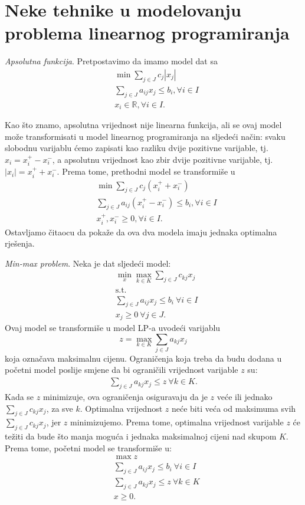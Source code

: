 \documentclass[a4paper, utf8, 11pt, colorlinks]{book}
\begin{document}
\section{Neke tehnike u modelovanju problema linearnog programiranja}

\emph{Apsolutna funkcija}.   Pretpostavimo da imamo model dat sa 
\begin{align*}
	&\min \sum_{j \in J} c_j |x_j| \\
	& \sum_{j\in J} a_{ij} x_j \leq b_i, \forall i\in I \\
	& x_i \in \mathbb{R}, \forall i \in I.
\end{align*} 

Kao što znamo, apsolutna vrijednost nije linearna funkcija, ali se ovaj model može transformisati u model linearnog programiranja na sljedeći način: 
svaku slobodnu varijablu ćemo zapisati kao razliku dvije pozitivne varijable, tj.  $x_i = x_i^+ - x_i^-$, a apsolutnu vrijednost kao zbir dvije pozitivne varijable, tj. $|x_i|= x_i^+ + x_i^-$. Prema tome, prethodni model se transformiše  u 
\begin{align*}
	&\min \sum_{j \in J} c_j  (x_i^+ + x_i^-) \\
	&\sum_{j\in J} a_{ij} (  x_i^+ - x_i^- ) \leq b_i, \forall i\in I \\
	&  x_i^+, x_i^- \geq 0, \forall i \in I.
\end{align*}
Ostavljamo čitaocu da pokaže da ova dva modela imaju jednaka optimalna rješenja.

\emph{Min-max problem}. Neka je dat sljedeći model: 
\begin{align*}
	&\min_{x} \max_{k \in K} \sum_{j \in J} c_{kj} x_j \\
	&\mbox{s.t.} \nonumber \\
	& \sum_{j \in J} a_{ij} x_j \leq b_i\  \forall i \in I \\
	& x_j \geq 0\ \forall j \in J.
\end{align*}
Ovaj  model se transformiše u model LP-a uvodeći varijablu $$z=\max_{k \in K} \sum_{j \in J} a_{kj}x_j$$ koja označava maksimalnu cijenu. Ograničenja koja treba da budu dodana u početni model poslije smjene da bi ograničili vrijednost varijable $z$ su:
\begin{eqnarray}
	\sum_{j \in J} a_{kj} x_j \leq z\ \forall k \in K.
\end{eqnarray}
Kada se $z$ minimizuje, ova ograničenja osiguravaju da je $z$ veće ili jednako  $\sum_{j \in J} c_{kj}x_j$, za sve $k$. Optimalna vrijednost $z$ neće biti veća od maksimuma svih $\sum_{j \in J} c_{kj}x_j$, jer  $z$ minimizujemo. Prema tome, optimalna vrijednost varijable $z$ će težiti da bude što manja moguća i jednaka maksimalnoj cijeni nad skupom $K$. Prema tome, početni model se transformiše u:
\begin{align*}
	&\max z \\
	&\sum_{j \in J} a_{ij} x_j \leq b_i\  \forall i \in I \\ 
	& 	 \sum_{j \in J} a_{kj} x_j \leq z\ \forall k \in K \\
	& x \geq 0.
\end{align*}
\end{document}
